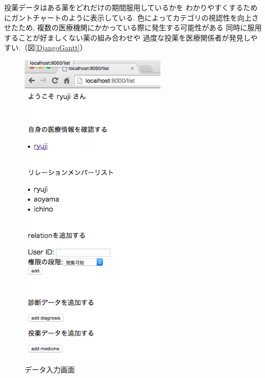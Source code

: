     投薬データはある薬をどれだけの期間服用しているかを
    わかりやすくするためにガントチャートのように表示している.
    色によってカテゴリの視認性を向上させたため,
    複数の医療機関にかかっている際に発生する可能性がある
    同時に服用することが好ましくない薬の組み合わせや
    過度な投薬を医療関係者が発見しやすい.（図\ref{DjangoGantt}）



    \begin{figure}[htbp]
      \begin{center}
        \includegraphics[width=7cm, bb=0 0 330 731, clip]{./gazou/DjangoFileio4.png}
      \end{center}
      \caption{データ入力画面}
      \label{DjangoFileio}
    \end{figure}

